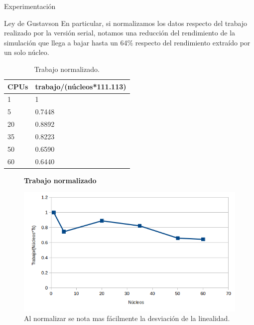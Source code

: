 \begin{section}{Experimentación}
\begin{subsection}{Ley de Gustavson}
En particular, si normalizamos los datos respecto del trabajo realizado por la versión serial, notamos una reducción del rendimiento de la simulación que llega a bajar hasta un 64\% respecto del rendimiento extraído por un solo núcleo.


\begin{center}
\begin{table}[h]
    \begin{tabular}{ | l | l |}
    \hline
CPUs & trabajo/(núcleos*111.113) \\ \hline
1    & 1 \\ \hline
5    & 0.7448 \\ \hline
20   & 0.8892 \\ \hline
35   & 0.8223 \\ \hline
50   & 0.6590 \\ \hline
60   & 0.6440 \\ \hline
    \end{tabular}
    \caption{Trabajo normalizado.}
\end{table}
\end{center}

\begin{figure}
\textbf{Trabajo normalizado}\par\medskip

\includegraphics[width=.75\textwidth,height=.75\textheight,keepaspectratio]{figures/exp_gustafson_work_norm}
\caption{Al normalizar se nota mas fácilmente la desviación de la linealidad.}
\label{fig:exp_gustafson_work_norm}

\end{figure}



~\\


\end{subsection}
\end{section}
